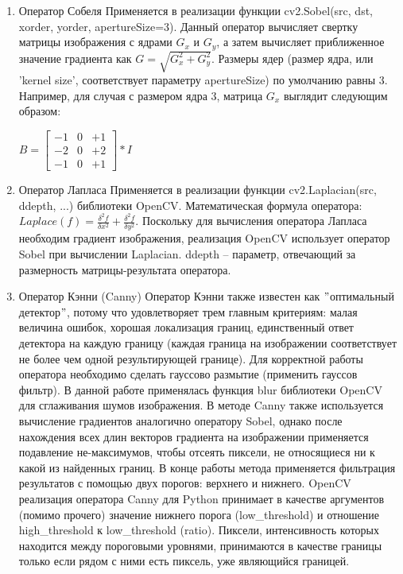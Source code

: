\begin{enumerate}
	\item Оператор Собеля
	\newline
	Применяется в реализации функции cv2.Sobel(src, dst, xorder, yorder, apertureSize=3). Данный оператор вычисляет свертку матрицы изображения с ядрами $G_x$ и $G_y$, а затем вычисляет приближенное значение градиента как $G = \sqrt{G^{2}_x + G^{2}_y}$. Размеры ядер (размер ядра, или 'kernel size', соответствует параметру apertureSize) по умолчанию равны 3.
	\newline Например, для случая с размером ядра 3, матрица $G_x$ выглядит следующим образом: 
	\newline
\begin{center}
		$B = 
	\begin{bmatrix}
		-1 & 0 & +1 \\
		-2 & 0 & +2 \\
		-1 & 0 & +1
	\end{bmatrix} * I$
\end{center}
	\item Оператор Лапласа
	\newline
	Применяется в реализации функции cv2.Laplacian(src, ddepth, ...) библиотеки OpenCV. Математическая формула оператора: $Laplace(f) = \frac{\delta^{2}f}{\delta x^{2}} + \frac{\delta^{2}f}{\delta y^{2}}$.
	\newline
	Поскольку для вычисления оператора Лапласа необходим градиент изображения, реализация OpenCV использует оператор Sobel при вычислении Laplacian. ddepth -- параметр, отвечающий за размерность матрицы-результата оператора.

	\item Оператор Кэнни (Canny)	
	\newline
	Оператор Кэнни также известен как $"$оптимальный детектор$"$, потому что удовлетворяет трем главным критериям: малая величина ошибок, хорошая локализация границ, единственный ответ детектора на каждую границу (каждая граница на изображении соответствует не более чем одной результирующей границе).  
	\newline 
	Для корректной работы оператора необходимо сделать гауссово размытие (применить гауссов фильтр). В данной работе применялась функция blur библиотеки OpenCV для сглаживания шумов изображения.
	\newline
	В методе Canny также используется вычисление градиентов аналогично оператору Sobel, однако после нахождения всех длин векторов градиента на изображении применяется подавление не-максимумов, чтобы отсеять пиксели, не относящиеся ни к какой из найденных границ.
	\newline
	В конце работы метода применяется фильтрация результатов с помощью двух порогов: верхнего и нижнего. OpenCV реализация оператора Canny для Python принимает в качестве аргументов (помимо прочего) значение нижнего порога (low\_threshold) и отношение high\_threshold к low\_threshold (ratio). Пиксели, интенсивность которых находится между пороговыми уровнями, принимаются в качестве границы только если рядом с ними есть пиксель, уже являющийся границей.
	\newline 
\end{enumerate}


